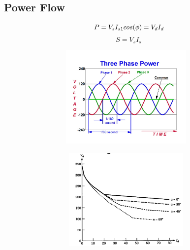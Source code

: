 \documentclass[twocolumn, ]{article}
\begin{document}
\subsection*{\small Power Flow}
\begin{equation*}
	\ P=V_{s}I_{s1}cos(\phi)=V_{d}I_{d}\\	
\end{equation*}
\begin{equation*}
	\ S=V_{s}I_{s}	
\end{equation*}

\begin{figure}[!ht]
\includegraphics[width=11cm, height=5cm]{3-PHASE-WAVE-FORM-small-150.jpg} 
\end{figure}
\begin{figure}[!ht]
\includegraphics[width=11cm,height=5cm]{thyristor_discontinuous_conduction2.png} 
\end{figure}
\end{document}
